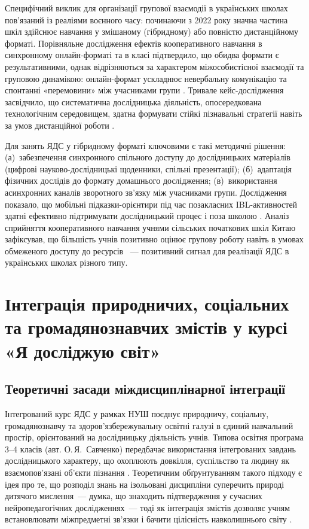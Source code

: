 \documentclass[a4paper,14pt]{extarticle}
\begin{document}
Специфічний виклик для організації групової взаємодії в українських школах пов'язаний із реаліями воєнного часу: починаючи з 2022 року значна частина шкіл здійснює навчання у змішаному (гібридному) або повністю дистанційному форматі. Порівняльне дослідження ефектів кооперативного навчання в синхронному онлайн-форматі та в класі підтвердило, що обидва формати є результативними, однак відрізняються за характером міжособистісної взаємодії та груповою динамікою: онлайн-формат ускладнює невербальну комунікацію та спонтанні «перемовини» між учасниками групи \parencite{Ralević2025}. Тривале кейс-дослідження засвідчило, що систематична дослідницька діяльність, опосередкована технологічним середовищем, здатна формувати стійкі пізнавальні стратегії навіть за умов дистанційної роботи \parencite{Viilo2018407}.

Для занять ЯДС у гібридному форматі ключовими є такі методичні рішення: (а)~забезпечення синхронного спільного доступу до дослідницьких матеріалів (цифрові науково-дослідницькі щоденники, спільні презентації); (б)~адаптація фізичних дослідів до формату домашнього дослідження; (в)~використання асинхронних каналів зворотного зв'язку між учасниками групи. Дослідження показало, що мобільні підказки-орієнтири під час позакласних IBL-активностей здатні ефективно підтримувати дослідницький процес і поза школою \parencite{Martin20245}. Аналіз сприйняття кооперативного навчання учнями сільських початкових шкіл Китаю зафіксував, що більшість учнів позитивно оцінює групову роботу навіть в умовах обмеженого доступу до ресурсів \parencite{Xiao2025117}~--- позитивний сигнал для реалізації ЯДС в українських школах різного типу.

\newpage

\section{Інтеграція природничих, соціальних та громадянознавчих змістів
у курсі «Я досліджую світ»}

\subsection{Теоретичні засади міждисциплінарної інтеграції}

Інтегрований курс ЯДС у рамках НУШ поєднує природничу, соціальну, громадянознавчу та здоров'язбережувальну освітні галузі в єдиний навчальний простір, орієнтований на дослідницьку діяльність учнів. Типова освітня програма 3--4 класів (авт. О.\,Я.~Савченко) передбачає використання інтегрованих завдань дослідницького характеру, що охоплюють довкілля, суспільство та людину як взаємопов'язані об'єкти пізнання \parencite{Savchenko2019}. Теоретичним обґрунтуванням такого підходу є ідея про те, що розподіл знань на ізольовані дисципліни суперечить природі дитячого мислення~--- думка, що знаходить підтвердження у сучасних нейропедагогічних дослідженнях~--- тоді як інтеграція змістів дозволяє учням встановлювати міжпредметні зв'язки і бачити цілісність навколишнього світу \parencite{Lehane20261}.
\end{document}
